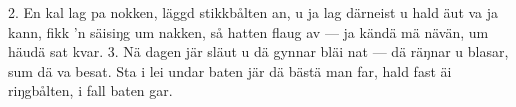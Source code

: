 2.  En kal lag pa nokken, läggd stikkbålten an,
    u ja lag därneist u hald äut va ja kann,
    fikk ’n säisiŋg um nakken, så hatten flaug av —
    ja kändä mä nävän, um häudä sat kvar.
3.  Nä dagen jär släut u dä gynnar bläi nat —
    dä räŋnar u blasar, sum dä va besat.
    Sta i lei undar baten jär dä bästä man far,
    hald fast äi riŋgbålten, i fall baten gar.
